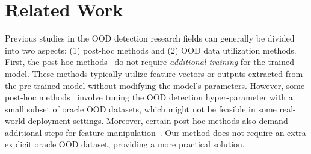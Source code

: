 \documentclass[letterpaper]{article} %
\begin{document}

\section{Related Work}
\vspace{-0.1cm}
Previous studies in the OOD detection research fields can generally be divided into two aspects: (1) post-hoc methods and (2) OOD data utilization methods.
First, the post-hoc methods~\cite{odin,entropy,energy,KLmatchingLogits,vim,mahalanobis,MaxLigit,DICE,RMD} do not require \textit{additional training} for the trained model.
These methods typically utilize feature vectors or outputs extracted 
from the pre-trained model without modifying the model's parameters.
However, some post-hoc methods~\cite{mahalanobis} involve tuning the OOD detection hyper-parameter with a small subset of oracle OOD datasets, which might not be feasible in some real-world deployment settings.
Moreover, certain post-hoc methods also demand additional steps for feature manipulation~\cite{KLmatchingLogits,mahalanobis}.
Our method does not require an extra explicit oracle OOD dataset, providing a more practical solution.
\end{document}
